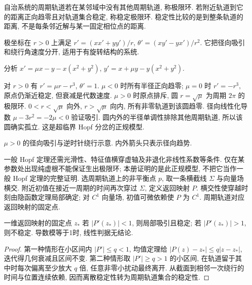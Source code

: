 \begin{definition}
自治系统的周期轨道若在某邻域中没有其他周期轨道, 称极限环. 若附近轨道到它的距离正向趋零且对轨道集合稳定, 称稳定极限环. 稳定性比较的是到整条轨道的距离, 不是每条邻近解与某一固定相位点的距离.
\end{definition}
极坐标在 $r>0$ 上满足 $r'=(xx'+yy')/r$, $\theta'=(xy'-yx')/r^2$. 它把径向吸引和绕行角速度分开, 适用于有旋转结构的系统.
\begin{example}分析 $x'=\mu x-y-x(x^2+y^2)$, $y'=x+\mu y-y(x^2+y^2)$.\end{example}
\begin{solution}
对 $r>0$ 有 $r'=\mu r-r^3$, $\theta'=1$. $\mu<0$ 时所有半径正向趋零; $\mu=0$ 时 $r'=-r^3$, 原点仍渐近稳定, 但衰减是代数速度. $\mu>0$ 时原点排斥, 圆 $r=\sqrt\mu$ 为周期 $2\pi$ 的极限环. $0<r<\sqrt\mu$ 向外, $r>\sqrt\mu$ 向内, 所有非零轨道到该圆趋零. 径向线性化导数 $\mu-3r^2=-2\mu<0$ 验证吸引. 圆内外的半径单调性排除其他周期轨道, 所以该圆确实孤立. 这是超临界 Hopf 分岔的正规模型.
\end{solution}
\begin{center}

$\mu>0$ 的径向吸引与逆时针绕行示意. 内外箭头只表示径向趋势.
\end{center}
一般 Hopf 定理还需光滑性、特征值横穿虚轴及非退化非线性系数等条件. 仅在某参数处出现纯虚根不能保证生出极限环; 本册证明的是此正规模型, 不把它当作一般 Hopf 定理的完整证明.
选周期轨道上的非平衡点 $p$, 取一条横截线 $\Sigma$ 与向量场横交. 附近初值在接近一周期的时间再次穿过 $\Sigma$, 定义返回映射 $P$. 横交性使穿越时刻由隐函数定理局部确定; 对 $C^1$ 向量场, 初值可微依赖使 $P$ 为 $C^1$. 周期轨道对应返回映射的固定点.
\begin{proposition}
一维返回映射的固定点 $z_*$ 若 $|P'(z_*)|<1$, 则局部吸引且稳定; 若 $|P'(z_*)|>1$, 则不稳定. 导数模等于1时, 线性判据无结论.
\end{proposition}
\begin{proof}
第一种情形在小区间内 $|P'|\le q<1$, 均值定理给 $|P(z)-z_*|\le q|z-z_*|$, 迭代得几何衰减且区间不变. 第二种情形取 $|P'|\ge q>1$ 的小区间, 在轨道留于其中时每次偏离至少放大 $q$ 倍, 任意非零小扰动最终离开. 从截面到相邻一次绕行的时间与位置连续依赖, 因而离散稳定性转为周期轨道集合的稳定性.
\end{proof}
